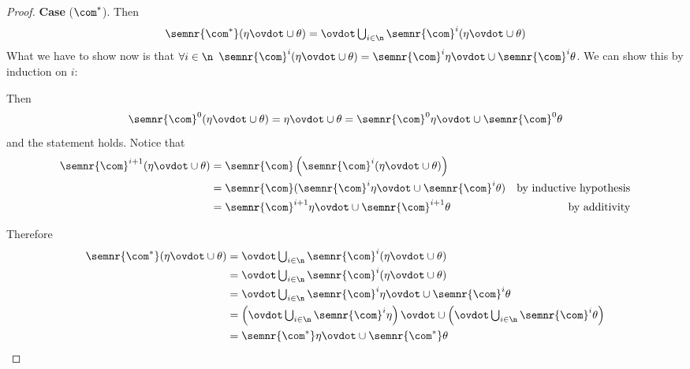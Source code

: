 \begin{proof}
  \noindent
  \textbf{Case}  (\(\com^*\)).
  Then
  \begin{equation*}
    \semnr{\com^*}(\eta\ovdot\cup\theta) = \textstyle \ovdot\bigcup_{i\in\n} \semnr{\com}^i(\eta \ovdot\cup \theta) \\
  \end{equation*}
  What we have to show now is that \(\forall i \in \n\)
  \(\semnr{\com}^i(\eta \ovdot\cup \theta) = \semnr{\com}^i \eta \ovdot\cup
  \semnr{\com}^i\theta\). We can show this by induction on \(i\):
  \begin{inductive}
   Then
    \begin{equation*}
      \semnr{\com}^0(\eta\ovdot\cup\theta) = \eta\ovdot\cup\theta = \semnr{\com}^0\eta \ovdot\cup \semnr{\com}^0\theta
    \end{equation*}
    and the statement holds.
     Notice that
    \begin{align*}
      \semnr{\com}^{i+1}(\eta \ovdot\cup \theta) & = \semnr{\com}\left(\semnr{\com}^i(\eta \ovdot\cup \theta)\right) \\
                                                 & = \semnr{\com}(\semnr{\com}^i\eta \ovdot\cup \semnr{\com}^i\theta) & \text{by inductive hypothesis} \\
                                                 & = \semnr{\com}^{i+1}\eta \ovdot\cup \semnr{\com}^{i+1}\theta & \text{by additivity}
    \end{align*}
  \end{inductive}
  Therefore
  \begin{align*}
    \semnr{\com^*}(\eta\ovdot\cup\theta) & = \textstyle \ovdot\bigcup_{i\in\n} \semnr{\com}^i(\eta \ovdot\cup \theta) \\
                                         & = \textstyle \ovdot\bigcup_{i\in\n}\semnr{\com}^i(\eta \ovdot\cup \theta) \\
                                         & = \textstyle \ovdot\bigcup_{i\in\n}\semnr{\com}^i\eta \ovdot\cup \semnr{\com}^i\theta \\
                                         & = \left(\textstyle \ovdot\bigcup_{i\in\n} \semnr{\com}^i\eta\right) \ovdot\cup \left(\textstyle \ovdot\bigcup_{i\in\n} \semnr{\com}^i\theta\right) \\
                                         & = \semnr{\com^*} \eta \ovdot\cup \semnr{\com^*}\theta
  \end{align*}
\end{proof}

